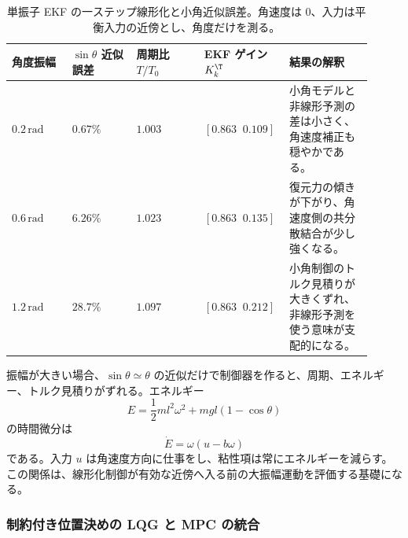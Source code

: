 \begin{table}[tb]
  \centering
  \footnotesize
  \caption{単振子 EKF の一ステップ線形化と小角近似誤差。角速度は 0、入力は平衡入力の近傍とし、角度だけを測る。}
  \label{tab:w08-pendulum-ekf-nonlinear}
  \begin{tabular}{@{}>{\raggedright\arraybackslash}p{0.16\linewidth}>{\raggedright\arraybackslash}p{0.17\linewidth}>{\raggedright\arraybackslash}p{0.18\linewidth}>{\raggedright\arraybackslash}p{0.18\linewidth}>{\raggedright\arraybackslash}p{0.22\linewidth}@{}}
    \hline
    角度振幅 & $\sin\theta$ 近似誤差 & 周期比 $T/T_0$ & EKF ゲイン $K_k^\T$ & 結果の解釈 \\
    \hline
    $0.2\,\mathrm{rad}$ &
    $0.67\%$ &
    $1.003$ &
    $[0.863\;\;0.109]$ &
    小角モデルと非線形予測の差は小さく、角速度補正も穏やかである。 \\
    $0.6\,\mathrm{rad}$ &
    $6.26\%$ &
    $1.023$ &
    $[0.863\;\;0.135]$ &
    復元力の傾きが下がり、角速度側の共分散結合が少し強くなる。 \\
    $1.2\,\mathrm{rad}$ &
    $28.7\%$ &
    $1.097$ &
    $[0.863\;\;0.212]$ &
    小角制御のトルク見積りが大きくずれ、非線形予測を使う意味が支配的になる。 \\
    \hline
  \end{tabular}
\end{table}

振幅が大きい場合、$\sin\theta\simeq\theta$ の近似だけで制御器を作ると、周期、エネルギー、トルク見積りがずれる。エネルギー
\begin{equation}
  E=
  \frac{1}{2}ml^2\omega^2+mgl(1-\cos\theta)
\end{equation}
の時間微分は
\begin{equation}
  \dot{E}
  =
  \omega(u-b\omega)
\end{equation}
である。入力 $u$ は角速度方向に仕事をし、粘性項は常にエネルギーを減らす。この関係は、線形化制御が有効な近傍へ入る前の大振幅運動を評価する基礎になる。

\subsubsection{制約付き位置決めの LQG と MPC の統合}

